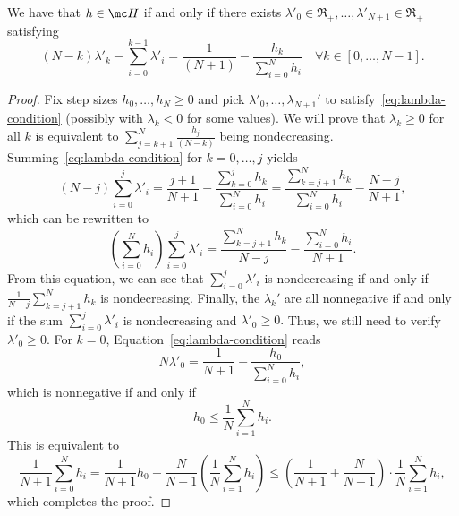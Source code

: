 \documentclass{article}
\begin{document}
\begin{toappendix}
  \begin{lemma}
    We have that $h\in \mc H$ if and only if there exists $\lambda'_0\in \Re_+, \dots, \lambda'_{N+1}\in \Re_+$ satisfying
    \begin{equation}\label{eq:lambda-condition}
      (N-k) \lambda'_k - \sum_{i=0}^{k-1} \lambda'_i = \frac{1}{(N+1)} - \frac{h_k}{\sum_{i=0}^N h_i} \quad \forall k\in [0, \dots, N-1].
    \end{equation}   
  \end{lemma}
  \begin{proof}
    Fix step sizes $h_0,\dots,h_{N}\ge0$ and pick $\lambda'_0,\dots,\lambda_{N+1}'$ to satisfy~\eqref{eq:lambda-condition} (possibly with $\lambda_k<0$ for some values). We will prove that $\lambda_k\ge0$ for all $k$ is equivalent to $\sum_{j=k+1}^N \tfrac{h_j}{(N-k)}$ being nondecreasing.
    Summing~\eqref{eq:lambda-condition} for $k=0,\dots,j$ yields
    \[
    (N-j)\sum_{i=0}^j\lambda'_i=\frac{j+1}{N+1}-\frac{\sum_{k=0}^j h_k}{\sum_{i=0}^Nh_i}=\frac{\sum_{k=j+1}^N h_k}{\sum_{i=0}^Nh_i}-\frac{N-j}{N+1},
    \]
    which can be rewritten to
    \[
    \left(\sum_{i=0}^Nh_i\right)\sum_{i=0}^j\lambda'_i=\frac{\sum_{k=j+1}^N h_k}{N-j}-\frac{\sum_{i=0}^Nh_i}{N+1}.
    \]
    From this equation, we can see that $\sum_{i=0}^j\lambda'_i$ is nondecreasing if and only if $\frac1{N-j}\sum_{k=j+1}^N h_k$ is nondecreasing. Finally, the $\lambda_k'$ are all nonnegative if and only if the sum $\sum_{i=0}^j\lambda'_i$ is nondecreasing and $\lambda'_0\ge0.$ Thus, we still need to verify $\lambda'_0\ge0.$ For $k=0$, Equation~\eqref{eq:lambda-condition} reads
    \[
    N\lambda'_0=\frac1{N+1}-\frac{h_0}{\sum_{i=0}^N h_i},
    \]
    which is nonnegative if and only if
    \[
    h_0\le \frac1{N}\sum_{i=1}^N h_i.
    \]
    This is equivalent to
    \[
    \frac{1}{N+1}\sum_{i=0}^N h_i=\frac1{N+1}h_0+\frac{N}{N+1}\left(\frac1N\sum_{i=1}^N h_i\right)\le \left(\frac1{N+1}+\frac{N}{N+1}\right)\cdot\frac1N\sum_{i=1}^N h_i,
    \]
    which completes the proof.
  \end{proof}
\end{toappendix}

\begin{algorithm}[!ht]
\small
\DontPrintSemicolon
{}
\BlankLine
{}
\BlankLine
{} 
\caption{Admissible subgradient method with step sizes $h_k$.}
\label{alg:step-sizes}
\end{algorithm}
\end{document}
